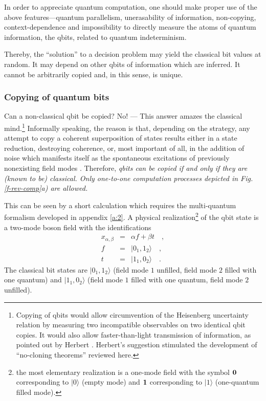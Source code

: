 In order to appreciate  quantum computation, one should make proper use of
the above features---quantum parallelism, unerasability of
information, non-copying, context-dependence and impossibility to
directly measure the atoms of quantum information, the qbits, related to
quantum indeterminism.


Thereby, the
``solution''
to a decision problem
may yield the classical bit values
at random.
It may depend on other qbits of information which are inferred.
It cannot be arbitrarily copied and, in this sense, is unique.



\subsubsection{Copying of quantum bits}

Can a non-classical qbit
be copied? No! ---
This answer amazes the classical
mind.\footnote{Copying of qbits would allow circumvention of the
Heisenberg uncertainty relation by measuring two incompatible
observables on two identical qbit copies. It would also allow
faster-than-light transmission of information, as pointed out by Herbert
\cite{herbert}. Herbert's suggestion stimulated the development of
``no-cloning theorems'' reviewed here.}
Informally speaking, the reason is that, depending on the strategy, any
attempt to copy a coherent superposition
of states results either in a state reduction, destroying coherence,
or, most important of all, in the addition of noise which manifests
itself
as the spontaneous excitations of previously nonexisting field modes
\cite{wo-zu,dieks,mandel:83,mil-hard,glauber,caves}.
Therefore, {\em qbits can be copied if and only if they
are (known to be) classical.
Only one-to-one computation processes depicted in Fig.
\ref{f-rev-comp}a) are allowed.}

This can be seen by a short calculation \cite{wo-zu} which requires the
multi-quantum formalism developed in appendix \ref{a:2}.
A physical realization\footnote{the most elementary realization is a
one-mode field with the symbol ${\bf 0}$
corresponding to $\mid  0\rangle  $ (empty mode) and
${\bf 1}$ corresponding to $\mid  1\rangle  $ (one-quantum filled mode).}
 of the qbit state
is a two-mode boson field
with the identifications
\begin{eqnarray}
 x_{\alpha ,\beta}&=&\alpha f +\beta t
\quad ,\\
f&=& \mid  0_1,1_2\rangle
\quad ,\\
t &=& \mid  1_1,0_2\rangle
\quad .
\end{eqnarray}
The classical bit states are
$\vert 0_1,1_2\rangle $
 (field mode $1$ unfilled, field mode $2$
filled with one quantum)
and
$\vert 1_1,0_2\rangle       $
 (field mode $1$
filled with one quantum, field mode $2$ unfilled).


